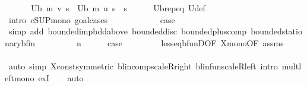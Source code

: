 \begin{isabellebody}
\isamarkupfalse%
\ \ {\isacharminus}{\kern0pt}\isanewline
\ \ \isamarkupfalse%
\ {\isachardoublequoteopen}U\isactrlsub b\ m\ v\ s\ {\isasymle}\ U\isactrlsub b\ m\ u\ s{\isachardoublequoteclose}\ \ s\isanewline
\ \ \ \ \isamarkupfalse%
\ U\isactrlsub b{\isachardot}{\kern0pt}rep{\isacharunderscore}{\kern0pt}eq\ U{\isacharunderscore}{\kern0pt}def\isanewline
\ \ \isamarkupfalse%
\ {\isacharparenleft}{\kern0pt}intro\ cSUP{\isacharunderscore}{\kern0pt}mono{\isacharcomma}{\kern0pt}\ goal{\isacharunderscore}{\kern0pt}cases{\isacharparenright}{\kern0pt}\isanewline
\ \ \ \ \isamarkupfalse%
\ {}\isanewline
\ \ \ \ \isamarkupfalse%
\ {\isacharquery}{\kern0pt}case\isanewline
\ \ \ \ \ \ \isamarkupfalse%
\ {\isacharparenleft}{\kern0pt}simp\ add{\isacharcolon}{\kern0pt}\ bounded{\isacharunderscore}{\kern0pt}imp{\isacharunderscore}{\kern0pt}bdd{\isacharunderscore}{\kern0pt}above\ bounded{\isacharunderscore}{\kern0pt}disc{\isacharunderscore}{\kern0pt}{\isasymP}\ bounded{\isacharunderscore}{\kern0pt}plus{\isacharunderscore}{\kern0pt}comp\ bounded{\isacharunderscore}{\kern0pt}stationary{\isacharunderscore}{\kern0pt}{\isasymnu}\isactrlsub b{\isacharunderscore}{\kern0pt}fin{\isacharparenright}{\kern0pt}\isanewline
\ \ \isamarkupfalse%
\isanewline
\ \ \ \ \isamarkupfalse%
\ {\isacharparenleft}{\kern0pt}{}\ n{\isacharparenright}{\kern0pt}\isanewline
\ \ \ \ \isamarkupfalse%
\ {\isacharquery}{\kern0pt}case\ \isanewline
\ \ \ \ \ \ \isamarkupfalse%
\ less{\isacharunderscore}{\kern0pt}eq{\isacharunderscore}{\kern0pt}bfunD{\isacharbrackleft}{\kern0pt}OF\ {\isasymP}\isactrlsub X{\isacharunderscore}{\kern0pt}mono{\isacharbrackleft}{\kern0pt}OF\ assms{\isacharbrackright}{\kern0pt}{\isacharbrackright}{\kern0pt}\isanewline
\ \ \ \ \ \ \isamarkupfalse%
\ {\isacharparenleft}{\kern0pt}auto\ simp{\isacharcolon}{\kern0pt}\ {\isasymP}\isactrlsub X{\isacharunderscore}{\kern0pt}const{\isacharbrackleft}{\kern0pt}symmetric{\isacharbrackright}{\kern0pt}\ blincomp{\isacharunderscore}{\kern0pt}scaleR{\isacharunderscore}{\kern0pt}right\ blinfun{\isachardot}{\kern0pt}scaleR{\isacharunderscore}{\kern0pt}left\ intro{\isacharbang}{\kern0pt}{\isacharcolon}{\kern0pt}\ mult{\isacharunderscore}{\kern0pt}left{\isacharunderscore}{\kern0pt}mono\ exI{\isacharparenright}{\kern0pt}\isanewline
\ \ \isamarkupfalse%
\ auto\isanewline

\end{isabellebody}
